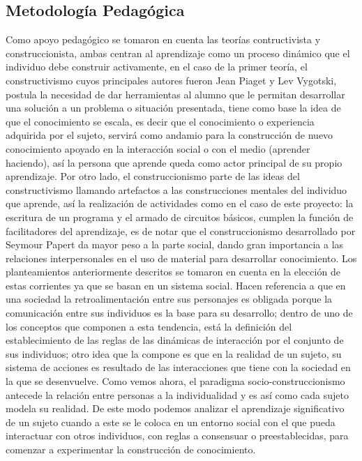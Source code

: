 \documentclass[letterpaper,10pt]{article}
\begin{document}
\subsection{Metodología Pedagógica}

Como apoyo pedagógico se tomaron en cuenta las teorías contructivista y
construccionista, ambas centran al aprendizaje como un  proceso dinámico que el individuo
debe construir activamente, en el caso de la primer teoría, el constructivismo
cuyos principales autores fueron Jean Piaget y Lev Vygotski, postula la
necesidad de dar herramientas al alumno  que le permitan desarrollar
una solución a un problema o situación presentada, tiene como base la idea de
que el conocimiento se escala, es decir que el conocimiento o experiencia
adquirida por el sujeto, servirá como andamio para la construcción de nuevo
conocimiento apoyado en la interacción social o con el medio (aprender haciendo), 
así la persona que aprende queda como actor principal de su propio
aprendizaje. Por otro lado, el construccionismo parte de las ideas del
constructivismo llamando artefactos a las construcciones mentales del individuo
que aprende, así la realización de  actividades como en el caso de
este proyecto: la escritura de un programa y el armado de circuitos básicos,
cumplen la función de facilitadores del aprendizaje, es de notar que el
construccionismo desarrollado por Seymour Papert  da mayor peso a la parte social, dando gran importancia a
las relaciones interpersonales en el uso de material para desarrollar
conocimiento.\newline
Los planteamientos anteriormente descritos se tomaron en cuenta en la elección de estas
corrientes ya que se basan en un sistema social. Hacen referencia a que en una sociedad
la retroalimentación entre sus personajes es obligada porque la comunicación entre 
sus individuos es la base para su desarrollo; dentro de uno de los conceptos que componen 
a esta tendencia, está la definición del establecimiento de las reglas de las 
dinámicas de interacción por el conjunto de sus individuos; otro idea que la 
compone es que en la realidad de un sujeto, su sistema de acciones es
resultado de las interacciones que tiene con la sociedad en la que se desenvuelve. 
Como vemos ahora, el paradigma socio-construccionismo antecede la 
relación entre personas a la individualidad y es así como cada sujeto modela su 
realidad. De este modo podemos analizar el aprendizaje significativo de un
sujeto cuando a este se le coloca en un entorno social con el que pueda interactuar
con otros individuos, con reglas a consensuar o preestablecidas, para comenzar
a experimentar la construcción de conocimiento.
\end{document}
